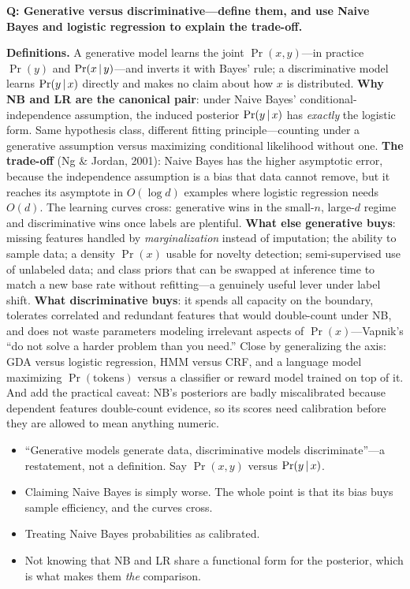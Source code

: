 \begin{interviewq}
\textbf{Q: Generative versus discriminative---define them, and use Naive Bayes and logistic regression to explain the trade-off.}

 \quad {} \quad \badgefreq{\freqmed}

\stronganswer

\textbf{Definitions.} A generative model learns the joint $\Pr(x,y)$---in practice $\Pr(y)$ and $\Pr(x\,|\, y)$---and inverts it with Bayes' rule; a discriminative model learns $\Pr(y\,|\, x)$ directly and makes no claim about how $x$ is distributed. \textbf{Why NB and LR are the canonical pair}: under Naive Bayes' conditional-independence assumption, the induced posterior $\Pr(y\,|\, x)$ has \emph{exactly} the logistic form. Same hypothesis class, different fitting principle---counting under a generative assumption versus maximizing conditional likelihood without one. \textbf{The trade-off} (Ng \& Jordan, 2001): Naive Bayes has the higher asymptotic error, because the independence assumption is a bias that data cannot remove, but it reaches its asymptote in $O(\log d)$ examples where logistic regression needs $O(d)$. The learning curves cross: generative wins in the small-$n$, large-$d$ regime and discriminative wins once labels are plentiful. \textbf{What else generative buys}: missing features handled by \emph{marginalization} instead of imputation; the ability to sample data; a density $\Pr(x)$ usable for novelty detection; semi-supervised use of unlabeled data; and class priors that can be swapped at inference time to match a new base rate without refitting---a genuinely useful lever under label shift. \textbf{What discriminative buys}: it spends all capacity on the boundary, tolerates correlated and redundant features that would double-count under NB, and does not waste parameters modeling irrelevant aspects of $\Pr(x)$---Vapnik's ``do not solve a harder problem than you need.'' Close by generalizing the axis: GDA versus logistic regression, HMM versus CRF, and a language model maximizing $\Pr(\text{tokens})$ versus a classifier or reward model trained on top of it. And add the practical caveat: NB's posteriors are badly miscalibrated because dependent features double-count evidence, so its scores need calibration before they are allowed to mean anything numeric.

\redflags
\begin{itemize}
    \item ``Generative models generate data, discriminative models discriminate''---a restatement, not a definition. Say $\Pr(x,y)$ versus $\Pr(y\,|\, x)$.
    \item Claiming Naive Bayes is simply worse. The whole point is that its bias buys sample efficiency, and the curves cross.
    \item Treating Naive Bayes probabilities as calibrated.
    \item Not knowing that NB and LR share a functional form for the posterior, which is what makes them \emph{the} comparison.
\end{itemize}


\end{interviewq}
